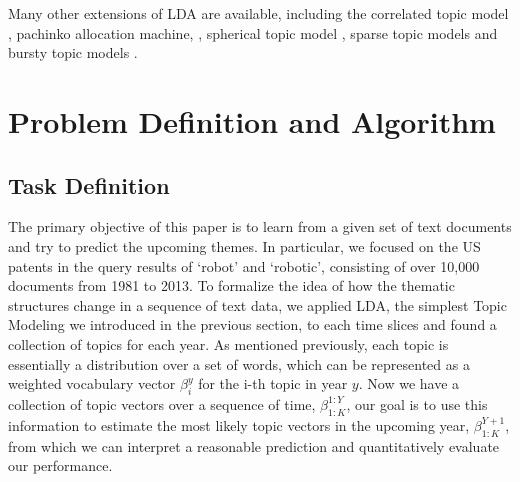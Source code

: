 \documentclass[conference]{IEEEtran}
\begin{document}
Many other extensions of LDA are available, including the correlated topic model \cite{blei2007a}, pachinko allocation machine,  \cite{li2006}, spherical topic model \cite{reisinger2010}, sparse topic models \cite{wang2009} and bursty topic models \cite{doyle2009}.



\section{Problem Definition and Algorithm}


\subsection{Task Definition}

The primary objective of this paper is to learn from a given set of text documents and try to predict the upcoming themes. In particular, we focused on the US patents in the query results of `robot' and `robotic', consisting of over 10,000 documents from 1981 to 2013. To formalize the idea of how the thematic structures change in a sequence of text data, we applied LDA\cite{lda2003}, the simplest Topic Modeling we introduced in the previous section, to each time slices and found a collection of topics for each year. As mentioned previously, each topic is essentially a distribution over a set of words, which can be represented as a weighted vocabulary vector $\beta_i^y$ for the i-th topic in year $y$. Now we have a collection of topic vectors over a sequence of time, $\beta_{1:K}^{1:Y}$, our goal is to use this information to estimate the most likely topic vectors in the upcoming year, $\beta_{1:K}^{Y+1}$, from which we can interpret a reasonable prediction and quantitatively evaluate our performance.


\end{document}
